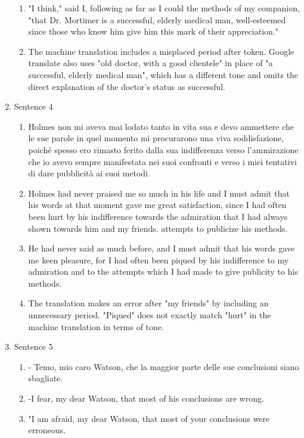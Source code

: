 \documentclass{article}
\begin{document}
\begin{enumerate}
\begin{enumerate}[label=(\alph*)]
        \item "I think," said I, following as far as I could the methods of my companion, "that Dr. Mortimer is a successful, elderly medical man, well-esteemed since those who know him give him this mark of their appreciation."
        \item The machine translation includes a misplaced period after token. Google translate also uses 
        "old doctor, with a good clientele" in place of "a successful, elderly medical man", which has 
        a different tone and omits the direct explanation of the doctor's status as successful.
    \end{enumerate}   
    \item Sentence 4
    \begin{enumerate}[label=(\alph*)]
        \item Holmes non mi aveva mai lodato tanto in vita sua e devo ammettere che le sue parole in quel momento mi procurarono una viva soddisfazione, poiché spesso ero rimasto ferito dalla sua indifferenza verso l'ammirazione che io avevo sempre manifestata nei suoi confronti e verso i miei tentativi di dare pubblicità ai suoi metodi.
        \item Holmes had never praised me so much in his life and I must admit that his words at that moment gave me great satisfaction, since I had often been hurt by his indifference towards the admiration that I had always shown towards him and my friends. attempts to publicize his methods.
        \item He had never said as much before, and I must admit that his words gave me keen pleasure, for I had often been piqued by his indifference to my admiration and to the attempts which I had made to give publicity to his methods.
        \item The translation makes an error after "my friends" by including an unnecessary period. "Piqued" does not 
            exactly match "hurt" in the machine translation in terms of tone. 
    \end{enumerate}    
    \item Sentence 5
    \begin{enumerate}[label=(\alph*)]
        \item  - Temo, mio caro Watson, che la maggior parte delle sue conclusioni siano sbagliate.
        \item -I fear, my dear Watson, that most of his conclusions are wrong.
        \item  "I am afraid, my dear Watson, that most of your conclusions were erroneous.

\end{enumerate}
\end{enumerate}
\end{document}
